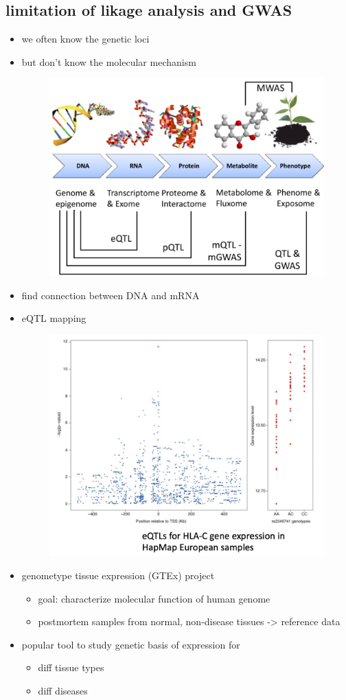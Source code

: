 \documentclass[font=12pt]{article}
\begin{document}
\subsection{limitation of likage analysis and GWAS}
\begin{itemize}
	\item we often know the genetic loci
	\item but don't know the molecular mechanism
	\begin{figure}[h!]
		\centering
		\includegraphics[width=0.4\linewidth]{eqtloverview}
		\label{fig:eqtloverview}
	\end{figure}
	\item find connection between DNA and mRNA
	\item eQTL mapping \begin{figure}[h!]
		\centering
		\includegraphics[width=0.5\linewidth]{eqtlmappingeg}
		\label{fig:eqtlmappingeg}
	\end{figure}
	\item genometype tissue expression (GTEx) project
	\begin{itemize}
		\item goal: characterize molecular function of human genome
		\item postmortem samples from normal, non-disease tissues -> reference data
	\end{itemize}
	\item popular tool to study genetic basis of expression for 
	\begin{itemize}
		\item diff tissue types
		\item diff diseases
	\end{itemize}
\end{itemize}
\end{document}
